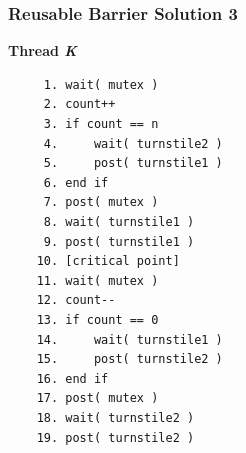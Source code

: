 \begin{frame}[fragile]
	\frametitle{Reusable Barrier Solution 3}
	\vspace{-0.5em}
	{\small
	\textbf{Thread \textit{K}}\vspace{-0.5em}
	\begin{verbatim}
	 1. wait( mutex )
	 2. count++
	 3. if count == n
	 4.     wait( turnstile2 )
	 5.     post( turnstile1 )
	 6. end if
	 7. post( mutex )
	 8. wait( turnstile1 )
	 9. post( turnstile1 )
	10. [critical point]
	11. wait( mutex )
	12. count--
	13. if count == 0
	14.     wait( turnstile1 )
	15.     post( turnstile2 )
	16. end if
	17. post( mutex )
	18. wait( turnstile2 )
	19. post( turnstile2 )
  	\end{verbatim}}
	\vspace{-2em}


\end{frame}




